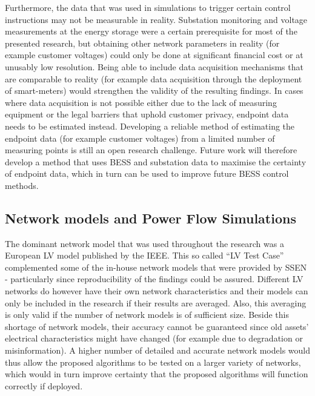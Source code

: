 Furthermore, the data that was used in simulations to trigger certain control instructions may not be measurable in reality.
Substation monitoring and voltage measurements at the energy storage were a certain prerequisite for most of the presented research, but obtaining other network parameters in reality (for example customer voltages) could only be done at significant financial cost or at unusably low resolution.
Being able to include data acquisition mechanisms that are comparable to reality (for example data acquisition through the deployment of smart-meters) would strengthen the validity of the resulting findings.
In cases where data acquisition is not possible either due to the lack of measuring equipment or the legal barriers that uphold customer privacy, endpoint data needs to be estimated instead.
Developing a reliable method of estimating the endpoint data (for example customer voltages) from a limited number of measuring points is still an open research challenge.
Future work will therefore develop a method that uses BESS and substation data to maximise the certainty of endpoint data, which in turn can be used to improve future BESS control methods.

\subsection{Network models and Power Flow Simulations}

The dominant network model that was used throughout the research was a European LV model published by the IEEE.
This so called ``LV Test Case'' complemented some of the in-house network models that were provided by SSEN - particularly since reproducibility of the findings could be assured.
Different LV networks do however have their own network characteristics and their models can only be included in the research if their results are averaged.
Also, this averaging is only valid if the number of network models is of sufficient size.
Beside this shortage of network models, their accuracy cannot be guaranteed since old assets' electrical characteristics might have changed (for example due to degradation or misinformation).
A higher number of detailed and accurate network models would thus allow the proposed algorithms to be tested on a larger variety of networks, which would in turn improve certainty that the proposed algorithms will function correctly if deployed.

